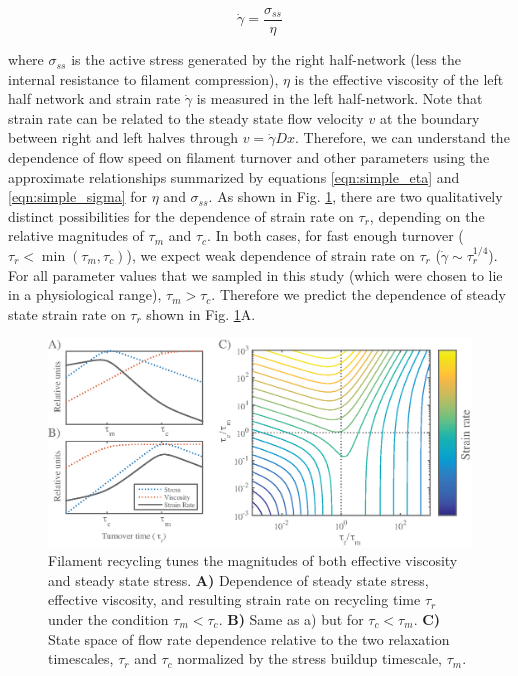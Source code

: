 \begin{equation}
	\label{eqn:everybody_knows}
	\dot{\gamma} = \frac{\sigma_{ss}}{\eta}  
\end{equation}


where $\sigma_{ss}$ is the active stress generated by the right half-network (less the internal resistance to filament compression), $\eta$ is the effective viscosity of the left half network and strain rate $\dot{\gamma}$ is measured in the left half-network.  Note that strain rate can be related to the steady state flow velocity $v$ at the boundary between right and left halves through $ v = \dot{\gamma}Dx$. Therefore, we can understand the dependence of flow speed on filament turnover and other parameters using the approximate relationships summarized by equations \ref{eqn:simple_eta} and \ref{eqn:simple_sigma} for $\eta$ and $\sigma_{ss}$.  As shown in Fig. \ref{fig:flow_theo}, there are two qualitatively distinct possibilities for the dependence of strain rate on $\tau_r$, depending on the relative magnitudes of $\tau_m$ and $\tau_c$.  In both cases, for fast enough turnover ($\tau_r < \min \left (\tau_m, \tau_c \right )$), we expect weak dependence of strain rate on $\tau_r$ ($ \dot{\gamma}\sim \tau_r^{1/4}$).  For all parameter values that we sampled in this study (which were chosen to lie in a physiological range), $\tau_m > \tau_c$. Therefore we predict the dependence of steady state strain rate on $\tau_r$ shown in Fig. \ref{fig:flow_theo}A.


\begin{figure}[h!]
	\centering
	\includegraphics[width=\hsize]{active/figures/Fig8}
	\caption{\label{fig:flow_theo}  Filament recycling tunes the magnitudes of both effective viscosity and steady state stress. \textbf{A)}  Dependence of steady state stress, effective viscosity, and resulting strain rate on recycling time $\tau_r$ under the condition $\tau_{m}<\tau_c$. \textbf{B)} Same as a) but for $\tau_c<\tau_{m}$.  \textbf{C)} State space of flow rate dependence relative to the two relaxation timescales, $\tau_r$ and $\tau_c$ normalized by the stress buildup timescale, $\tau_{m}$.  }
\end{figure}

